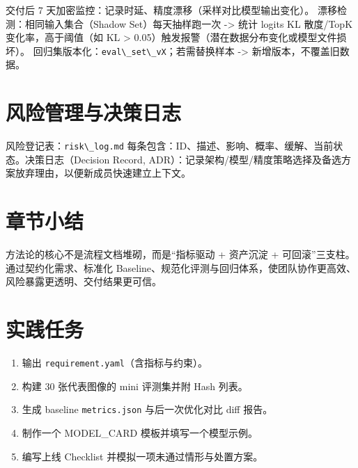 交付后 7 天加密监控：记录时延、精度漂移（采样对比模型输出变化）。
漂移检测：相同输入集合（Shadow Set）每天抽样跑一次 -\textgreater{} 统计
logits KL 散度/TopK 变化率，高于阈值（如 KL \textgreater{}
0.05）触发报警（潜在数据分布变化或模型文件损坏）。
回归集版本化：\passthrough{\lstinline!eval\_set\_vX!}；若需替换样本
-\textgreater{} 新增版本，不覆盖旧数据。

\section{风险管理与决策日志}\label{src-book-chapter10-h11}

风险登记表：\passthrough{\lstinline!risk\_log.md!}
每条包含：ID、描述、影响、概率、缓解、当前状态。决策日志（Decision
Record,
ADR）：记录架构/模型/精度策略选择及备选方案放弃理由，以便新成员快速建立上下文。

\section{章节小结}\label{src-book-chapter10-h12}

方法论的核心不是流程文档堆砌，而是``指标驱动 + 资产沉淀 +
可回滚''三支柱。通过契约化需求、标准化
Baseline、规范化评测与回归体系，使团队协作更高效、风险暴露更透明、交付结果更可信。

\section{实践任务}\label{src-book-chapter10-h13}

\begin{enumerate}
\def\labelenumi{\arabic{enumi}.}
\tightlist
\item
  输出 \passthrough{\lstinline!requirement.yaml!}（含指标与约束）。
\item
  构建 30 张代表图像的 mini 评测集并附 Hash 列表。
\item
  生成 baseline \passthrough{\lstinline!metrics.json!} 与后一次优化对比
  diff 报告。
\item
  制作一个 MODEL\_CARD 模板并填写一个模型示例。
\item
  编写上线 Checklist 并模拟一项未通过情形与处置方案。
\end{enumerate}
